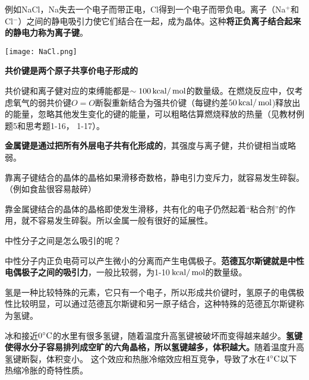 \documentclass[CJK]{beamer}
\begin{document}
\begin{frame}
\bch

例如NaCl，Na失去一个电子而带正电，Cl得到一个电子而带负电。离子（Na$^+$和Cl$^{-}$）之间的静电吸引力使它们结合在一起，成为晶体。这种{\bf 将正负离子结合起来的静电力称为离子键}。

\skipline

\bcenter
\texttt{[image: NaCl.png]}
\ecenter

\ech
\end{frame}

\begin{frame}
\bch

{\bf 共价键是两个原子共享价电子形成的} 


共价键和离子健对应的束缚能都是$\sim 100 \,\mathrm{kcal}/\,\mathrm{mol}$的数量级。在燃烧反应中，仅考虑氧气的弱共价键$O=O$断裂重新结合为强共价键（每键约差$50\,\mathrm{kcal}/\,\mathrm{mol}$)释放出的能量，忽略其他发生变化的键的能量，可以粗略估算燃烧释放的热量（见教材例题5和思考题1-16， 1-17）。
\ech
\end{frame}

\begin{frame}
\bch

{\bf 金属键是通过把所有外层电子共有化形成的}，其强度与离子健，共价键相当或略弱。


靠离子键结合的晶体的晶格如果滑移奇数格，静电引力变斥力，就容易发生碎裂。（例如食盐很容易敲碎）

\skipline

靠金属键结合的晶体的晶格即使发生滑移，共有化的电子仍然起着“粘合剂”的作用，就不容易发生碎裂。所以金属一般有很好的延展性。

\ech
\end{frame}

\begin{frame}
\bch

中性分子之间是怎么吸引的呢？


中性分子内正负电荷可以产生微小的分离而产生电偶极子。{\bf 范德瓦尔斯键就是中性电偶极子之间的吸引力}，一般比较弱，为1-10$\,\mathrm{kcal}/\,\mathrm{mol}$的数量级。
\ech
\end{frame}

\begin{frame}
\bch
氢是一种比较特殊的元素，它只有一个电子，所以形成共价键时，氢原子的电偶极性比较明显，可以通过范德瓦尔斯键和另一原子结合，这种特殊的范德瓦尔斯键称为氢键。



冰和接近$0^\circ \mathrm{C}$的水里有很多氢键，随着温度升高氢键被破坏而变得越来越少。{\bf 氢键使得水分子容易排列成空旷的六角晶格，所以氢键越多，体积越大。}随着温度升高氢键断裂，体积变小。
这个效应和热胀冷缩效应相互竞争，导致了水在$4^\circ \mathrm{C}$以下热缩冷胀的奇特性质。


\ech
\end{frame}
\end{document}
